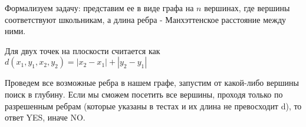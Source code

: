 \solutionSection

Формализуем задачу: представим ее в виде графа на $n$ вершинах, где вершины соответствуют школьникам, а длина ребра - Манхэттенское расстояние между ними.

Для двух точек на плоскости считается как $d(x_1, y_1, x_2, y_2) = |x_2 - x_1| + |y_2 - y_1|$

Проведем все возможные ребра в нашем графе, запустим от какой-либо вершины поиск в глубину. Если мы сможем посетить все вершины, проходя только по разрешенным ребрам (которые указаны в тестах и их длина не превосходит d), то ответ YES, иначе NO.

\codeExample

